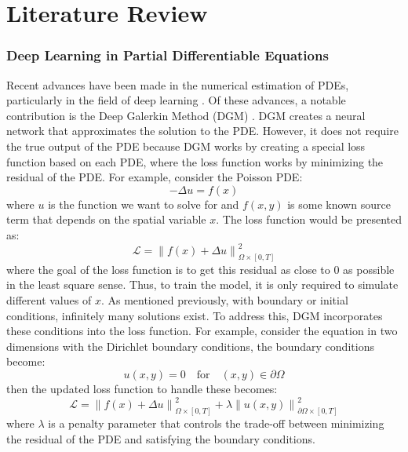 \section{Literature Review}
\label{sec:Methodology}
\subsubsection{Deep Learning in Partial Differentiable Equations}
Recent advances have been made in the numerical estimation of PDEs, particularly in the field of deep learning \cite{PDE-Meta}. Of these advances, a notable contribution is the Deep Galerkin Method (DGM) \cite{DGM}. DGM creates a neural network that approximates the solution to the PDE. However, it does not require the true output of the PDE because DGM works by creating a special loss function based on each PDE, where the loss function works by minimizing the residual of the PDE. For example, consider the Poisson PDE:
\begin{equation*}
    -\Delta u = f(x)
\end{equation*}
where \(u\) is the function we want to solve for and \(f(x, y)\) is some known source term that depends on the spatial variable  \(x\). The loss function would be presented as:
\begin{equation*}
    \mathcal{L} = \left\| f(x) + \Delta u \right\|^2_{\Omega \times [0,T]}
\end{equation*}
where the goal of the loss function is to get this residual as close to \(0\) as possible in the least square sense. Thus, to train the model, it is only required to simulate different values of \(x\). As mentioned previously, with boundary or initial conditions, infinitely many solutions exist. To address this, DGM incorporates these conditions into the loss function. For example, consider the equation in two dimensions with the Dirichlet boundary conditions, the boundary conditions become:
\begin{equation*}
    u(x, y) = 0 \quad \text{for} \quad (x, y) \in \partial\Omega
\end{equation*}
then the updated loss function to handle these becomes:
\begin{equation*}
    \mathcal{L} = \left\| f(x) + \Delta u \right\|^2_{\Omega \times [0,T]} + \lambda \left\| u(x, y) \right\|^2_{\partial\Omega \times [0,T]}
\end{equation*}
where \( \lambda \) is a penalty parameter that controls the trade-off between minimizing the residual of the PDE and satisfying the boundary conditions. 

